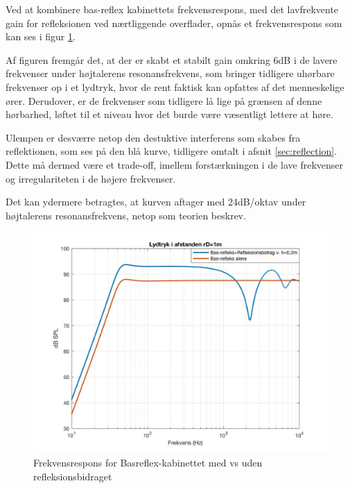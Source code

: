 Ved at kombinere bas-reflex kabinettets frekvensrespons, med det lavfrekvente gain for refleksionen ved nærtliggende overflader, opnås et frekvensrespons som kan ses i figur \ref{fig:sim_samletrespons}.

Af figuren fremgår det, at der er skabt et stabilt gain omkring 6dB i de lavere frekvenser under højtalerens resonansfrekvens, som bringer tidligere uhørbare frekvenser op i et lydtryk, hvor de rent faktisk kan opfattes af det menneskelige ører. Derudover, er de frekvenser som tidligere lå lige på grænsen af denne hørbarhed, løftet til et niveau hvor det burde være væsentligt lettere at høre.

Ulempen er desværre netop den destuktive interferens som skabes fra reflektionen, som ses på den blå kurve, tidligere omtalt i afsnit \ref{sec:reflection}.\\
Dette må dermed være et trade-off, imellem forstærkningen i de lave frekvenser og irregulariteten i de højere frekvenser. 

Det kan ydermere betragtes, at kurven aftager med 24dB/oktav under højtalerens resonansfrekvens, netop som teorien beskrev.
\begin{figure}[h!]
	\centering
	\includegraphics[width=\textwidth]{Pics/sim_samletrespons}
	\caption{Frekvensrespons for Basreflex-kabinettet med vs uden refleksionsbidraget} 
	\label{fig:sim_samletrespons}
\end{figure}




